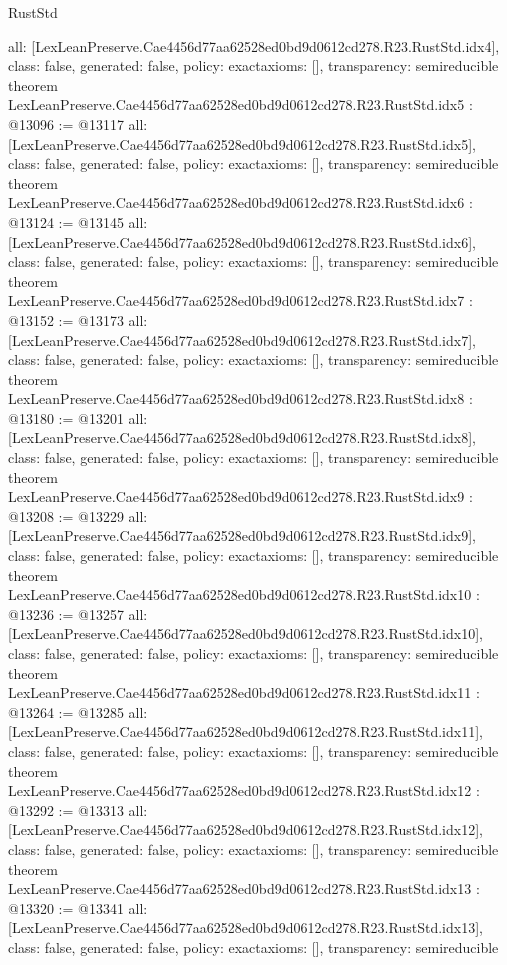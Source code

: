 \begin{lexlean}{RustStd}
\begin{coremodule}
{  all: [LexLeanPreserve.Cae4456d77aa62528ed0bd9d0612cd278.R23.RustStd.idx4],
  class: false,
  generated: false,
  policy: exact{axioms: []},
  transparency: semireducible
}
theorem LexLeanPreserve.Cae4456d77aa62528ed0bd9d0612cd278.R23.RustStd.idx5 : @13096 := @13117 {
  all: [LexLeanPreserve.Cae4456d77aa62528ed0bd9d0612cd278.R23.RustStd.idx5],
  class: false,
  generated: false,
  policy: exact{axioms: []},
  transparency: semireducible
}
theorem LexLeanPreserve.Cae4456d77aa62528ed0bd9d0612cd278.R23.RustStd.idx6 : @13124 := @13145 {
  all: [LexLeanPreserve.Cae4456d77aa62528ed0bd9d0612cd278.R23.RustStd.idx6],
  class: false,
  generated: false,
  policy: exact{axioms: []},
  transparency: semireducible
}
theorem LexLeanPreserve.Cae4456d77aa62528ed0bd9d0612cd278.R23.RustStd.idx7 : @13152 := @13173 {
  all: [LexLeanPreserve.Cae4456d77aa62528ed0bd9d0612cd278.R23.RustStd.idx7],
  class: false,
  generated: false,
  policy: exact{axioms: []},
  transparency: semireducible
}
theorem LexLeanPreserve.Cae4456d77aa62528ed0bd9d0612cd278.R23.RustStd.idx8 : @13180 := @13201 {
  all: [LexLeanPreserve.Cae4456d77aa62528ed0bd9d0612cd278.R23.RustStd.idx8],
  class: false,
  generated: false,
  policy: exact{axioms: []},
  transparency: semireducible
}
theorem LexLeanPreserve.Cae4456d77aa62528ed0bd9d0612cd278.R23.RustStd.idx9 : @13208 := @13229 {
  all: [LexLeanPreserve.Cae4456d77aa62528ed0bd9d0612cd278.R23.RustStd.idx9],
  class: false,
  generated: false,
  policy: exact{axioms: []},
  transparency: semireducible
}
theorem LexLeanPreserve.Cae4456d77aa62528ed0bd9d0612cd278.R23.RustStd.idx10 : @13236 := @13257 {
  all: [LexLeanPreserve.Cae4456d77aa62528ed0bd9d0612cd278.R23.RustStd.idx10],
  class: false,
  generated: false,
  policy: exact{axioms: []},
  transparency: semireducible
}
theorem LexLeanPreserve.Cae4456d77aa62528ed0bd9d0612cd278.R23.RustStd.idx11 : @13264 := @13285 {
  all: [LexLeanPreserve.Cae4456d77aa62528ed0bd9d0612cd278.R23.RustStd.idx11],
  class: false,
  generated: false,
  policy: exact{axioms: []},
  transparency: semireducible
}
theorem LexLeanPreserve.Cae4456d77aa62528ed0bd9d0612cd278.R23.RustStd.idx12 : @13292 := @13313 {
  all: [LexLeanPreserve.Cae4456d77aa62528ed0bd9d0612cd278.R23.RustStd.idx12],
  class: false,
  generated: false,
  policy: exact{axioms: []},
  transparency: semireducible
}
theorem LexLeanPreserve.Cae4456d77aa62528ed0bd9d0612cd278.R23.RustStd.idx13 : @13320 := @13341 {
  all: [LexLeanPreserve.Cae4456d77aa62528ed0bd9d0612cd278.R23.RustStd.idx13],
  class: false,
  generated: false,
  policy: exact{axioms: []},
  transparency: semireducible
}
\end{coremodule}
\end{lexlean}
